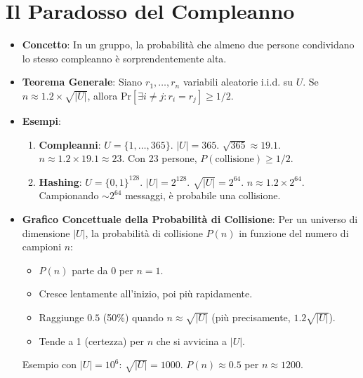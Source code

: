 \documentclass{article}
\begin{document}
\section{Il Paradosso del Compleanno}
\begin{itemize}
    \item \textbf{Concetto}: In un gruppo, la probabilità che almeno due persone condividano lo stesso compleanno è sorprendentemente alta.
    \item \textbf{Teorema Generale}: Siano $r_1, \dots, r_n$ variabili aleatorie i.i.d. su $U$.
    Se $n \approx 1.2 \times \sqrt{|U|}$, allora $\text{Pr}[\exists i \neq j : r_i = r_j] \ge 1/2$.
    \item \textbf{Esempi}:
    \begin{enumerate}
        \item \textbf{Compleanni}: $U = \{1, \dots, 365\}$. $|U|=365$. $\sqrt{365} \approx 19.1$. $n \approx 1.2 \times 19.1 \approx 23$. Con 23 persone, $P(\text{collisione}) \ge 1/2$.
        \item \textbf{Hashing}: $U = \{0,1\}^{128}$. $|U|=2^{128}$. $\sqrt{|U|} = 2^{64}$. $n \approx 1.2 \times 2^{64}$. Campionando $\sim 2^{64}$ messaggi, è probabile una collisione.
    \end{enumerate}
    \item \textbf{Grafico Concettuale della Probabilità di Collisione}:
    Per un universo di dimensione $|U|$, la probabilità di collisione $P(n)$ in funzione del numero di campioni $n$:
    \begin{itemize}
        \item $P(n)$ parte da 0 per $n=1$.
        \item Cresce lentamente all'inizio, poi più rapidamente.
        \item Raggiunge $0.5$ (50\%) quando $n \approx \sqrt{|U|}$ (più precisamente, $1.2 \sqrt{|U|}$).
        \item Tende a 1 (certezza) per $n$ che si avvicina a $|U|$.
    \end{itemize}
    Esempio con $|U|=10^6$: $\sqrt{|U|} = 1000$. $P(n) \approx 0.5$ per $n \approx 1200$.
    \begin{center}
\end{center}
\end{itemize}
\end{document}

